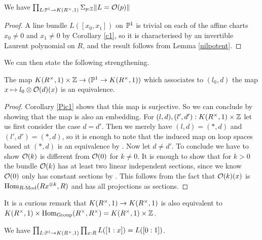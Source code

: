\begin{corollary}\label{Pic1}
  We have $\prod_{L:\mathbb{P}^1\rightarrow K(R^{\times},1)}\Sigma_{p:\mathbb{Z}}\|L = \mathcal{O}(p)\|$
\end{corollary}

\begin{proof}
A line bundle $L([x_0,x_1])$ on $\mathbb{P}^1$ is trivial on each of the affine charts $x_0\neq 0$ and $x_1\neq 0$ by Corollary \ref{c1}, so
it is characterised by an invertible Laurent polynomial on $R$, and the result follows from Lemma \ref{nilpotent}.
\end{proof}

We can then state the following strengthening.

\begin{proposition}\label{Matthias}
  The map $K(R^{\times},1)\times\mathbb{Z}\rightarrow (\mathbb{P}^1\rightarrow K(R^{\times},1))$
  which associates to $(l_0,d)$ the map $x\mapsto l_0\otimes \mathcal{O}(d)(x)$ is an equivalence.
\end{proposition}

\begin{proof}
  Corollary \ref{Pic1} shows that this map is surjective.
  So we can conclude by showing that the map is also an embedding.
  For $(l,d),(l',d'):K(R^{\times},1)\times\mathbb{Z}$ let us first consider the case $d=d'$. 
  Then we merely have $(l,d)=(\ast,d)$ and $(l',d')=(\ast,d)$,
  so it is enough to note that the induced map on loop spaces based at $(\ast,d)$ is an equivalence by .
  Now let $d\neq d'$. To conclude we have to show $\mathcal{O}(k)$ is different from $\mathcal{O}(0)$ for $k\neq 0$.
  It is enough to show that for $k>0$ the bundle $\mathcal{O}(k)$ has at least two linear independent sections,
  since we know $\mathcal{O}(0)$ only has constant sections by .
  This follows from the fact that $\mathcal{O}(k)(x)$ is $\mathrm{Hom}_{R\text{-}\mathrm{Mod}}(Rx^{\otimes k},R)$ and has all projections as sections.
\end{proof}

 It is a curious remark that $K(R^{\times},1)\rightarrow K(R^{\times},1)$ is also equivalent
 to $K(R^{\times},1)\times \mathrm{Hom}_{\mathrm{Group}}(R^\times,R^\times) = K(R^{\times},1)\times\mathbb{Z}$.

\begin{corollary}\label{Matthias1}
  We have $\prod_{L:\mathbb{P}^1\rightarrow K(R^{\times},1)}\prod_{x:R}L([1:x]) = L([0:1])$.
\end{corollary}


